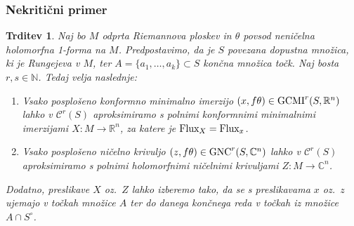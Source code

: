 \documentclass[12pt,a4paper,twoside]{article}
\theoremstyle{definition} %
\theoremstyle{plain} %
\newtheorem{trditev}[definicija]{Trditev}
\numberwithin{equation}{section}  %
\newcommand{\R}{\mathbb R}
\newcommand{\N}{\mathbb N}
\newcommand{\C}{\mathbb C}
\begin{document}
\subsubsection{Nekritični primer}
%
\begin{trditev} \label{trd:nekritcni-primer}
Naj bo $M$ odprta Riemannova ploskev in $\theta$ povsod neničelna holomorfna 1-forma na $M$.
Predpostavimo, da je $S$ povezana dopustna množica, ki je Rungejeva v $M$, ter $A=\{a_{1}, \dots , a_{k} \} \subset S$ končna množica točk. Naj bosta $r, s \in \N$. Tedaj velja naslednje:
\begin{enumerate}
\item 
Vsako posplošeno konformno minimalno imerzijo $(x, f\theta) \in \textup{GCMI}^{r}(S,\R^{n})$ lahko v $\mathcal{C}^{r}(S)$ aproksimiramo s polnimi konformnimi minimalnimi imerzijami $X \colon M \to \R^{n}$, za katere je $\textup{Flux}_{X} = \textup{Flux}_{x}$. 
\item
Vsako posplošeno ničelno krivuljo $(z, f\theta) \in \textup{GNC}^{r}(S,\C^{n})$ lahko v $\mathcal{C}^{r}(S)$ aproksimiramo s polnimi holomorfnimi ničelnimi krivuljami $Z \colon M \to \C^{n}$.
\end{enumerate}
Dodatno, preslikave $X$ oz.~$Z$ lahko izberemo tako, da se s preslikavama $x$ oz.~$z$ ujemajo v točkah množice $A$ ter do danega končnega reda v točkah iz množice $A \cap S^{\circ}$.
\end{trditev}
\end{document}
